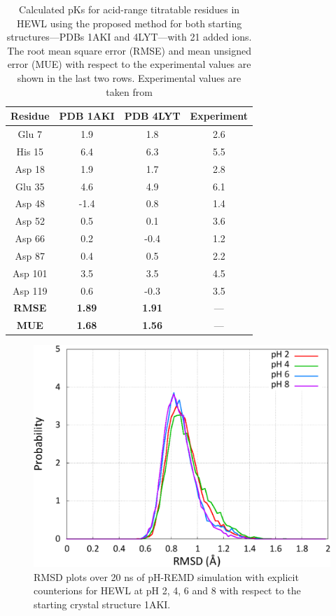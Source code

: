 \begin{table}
   \caption{Calculated pKs for acid-range titratable residues in HEWL
            using the proposed method for both starting structures---PDBs 1AKI
            and 4LYT---with 21 added ions. The root mean square error (RMSE) and
            mean unsigned error (MUE) with respect to the experimental values
            are shown in the last two rows.  Experimental values are taken from
            \citeauthor{Webb_Proteins_2011_v79_p685}
            \cite{Webb_Proteins_2011_v79_p685}}
   \begin{tabular}{cccc}
      Residue & PDB 1AKI & PDB 4LYT & Experiment
                                 \cite{Webb_Proteins_2011_v79_p685} \\
      \hline
      Glu 7 & 1.9 & 1.8 & 2.6 \\
      His 15 & 6.4 & 6.3 & 5.5 \\
      Asp 18 & 1.9 & 1.7 & 2.8 \\
      Glu 35 & 4.6 & 4.9 & 6.1 \\
      Asp 48 & -1.4 & 0.8 & 1.4 \\
      Asp 52 & 0.5 & 0.1 & 3.6 \\
      Asp 66 & 0.2 & -0.4 & 1.2 \\
      Asp 87 & 0.4 & 0.5 & 2.2 \\
      Asp 101 & 3.5 & 3.5 & 4.5 \\
      Asp 119 & 0.6 & -0.3 & 3.5 \\
      \hline
      \hline
      \textbf{RMSE} & \textbf{1.89} & \textbf{1.91} & --- \\
      \textbf{MUE} & \textbf{1.68} & \textbf{1.56} & --- \\
      \hline
   \end{tabular}
   \label{tbl4:hewl_ions_pkas}
\end{table}

\begin{figure}
   \includegraphics[width=6.5in]{1AKI_RMSDs_wions.eps}
   \caption{RMSD plots over 20 ns of pH-REMD simulation with explicit
            counterions for HEWL at pH 2, 4, 6 and 8 with respect to the
            starting crystal structure 1AKI.}
   \label{fig4:hewl_ions_rmsd}
\end{figure}

